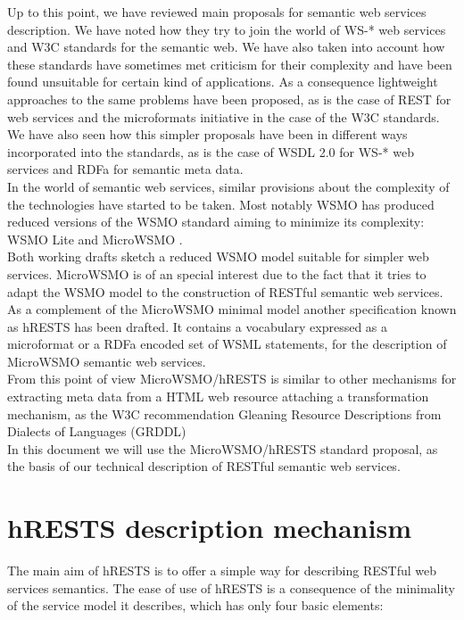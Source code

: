 Up to this point, we have reviewed main proposals for semantic web services description. We have noted how they try to join the
world of WS-* web services and W3C standards for the semantic web. We have also taken into account how these standards
have sometimes met criticism for their complexity and have been found unsuitable for certain kind of applications. As a consequence
lightweight approaches to the same problems have been proposed, as is the case of REST for web services and the microformats
initiative in the case of the W3C standards. We have also seen how this simpler proposals have been in different ways incorporated into the standards, as is the case of WSDL 2.0 for WS-* web services and RDFa for semantic meta data.\\

In the world of semantic web services, similar provisions about the complexity of the technologies have started to be
taken. Most notably WSMO has produced reduced versions of the WSMO standard aiming to minimize its complexity: WSMO Lite
\cite{wsmolite} and MicroWSMO \cite{microwsmo}.\\

Both working drafts sketch a reduced WSMO model suitable for simpler web services. MicroWSMO is of an special interest
due to the fact that it tries to adapt the WSMO model to the construction of RESTful semantic web services. As a
complement of the MicroWSMO minimal model another specification known as hRESTS \cite{hrests} has been drafted. It contains a vocabulary
expressed as a microformat or a RDFa encoded set of WSML statements, for the description of MicroWSMO semantic web
services. \\

From this point of view MicroWSMO/hRESTS is similar to other mechanisms for extracting meta data from a HTML web resource
attaching a transformation mechanism, as the W3C recommendation Gleaning Resource Descriptions from Dialects of
Languages (GRDDL) \cite{Connolly:07:GRD}\\

In this document we will use the MicroWSMO/hRESTS standard proposal, as the basis of our technical description of RESTful semantic web services.

\section{hRESTS description mechanism}

The main aim of hRESTS is to offer a simple way for describing RESTful web services semantics. The ease of use of hRESTS is a consequence of the minimality of the service model it describes, which has only four basic elements:

